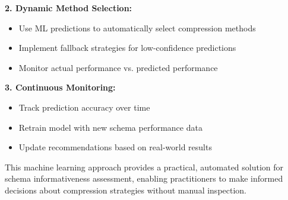 \textbf{2. Dynamic Method Selection:}
\begin{itemize}
    \item Use ML predictions to automatically select compression methods
    \item Implement fallback strategies for low-confidence predictions
    \item Monitor actual performance vs. predicted performance
\end{itemize}

\textbf{3. Continuous Monitoring:}
\begin{itemize}
    \item Track prediction accuracy over time
    \item Retrain model with new schema performance data
    \item Update recommendations based on real-world results
\end{itemize}

This machine learning approach provides a practical, automated solution for schema informativeness assessment, enabling practitioners to make informed decisions about compression strategies without manual inspection.


